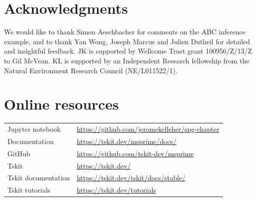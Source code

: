 \documentclass[graybox]{svmult}
\begin{document}
\section*{Acknowledgments}

We would like to thank Simon Aeschbacher for comments on the ABC inference example,
and to thank Yan Wong, Joseph Marcus and Julien Dutheil for
detailed and insightful feedback.
JK is supported by Wellcome Trust grant 100956/Z/13/Z to Gil McVean.
KL is supported by an Independent Research fellowship from the Natural Environment Research Council (NE/L011522/1).

\section*{Online resources}

\begin{tabular}{ll}
Jupyter notebook & \url{https://github.com/jeromekelleher/spg-chapter} \\
Documentation & \url{https://tskit.dev/msprime/docs/} \\
GitHub & \url{https://github.com/tskit-dev/msprime} \\
Tskit & \url{https://tskit.dev/} \\
Tskit documentation & \url{https://tskit.dev/tskit/docs/stable/} \\
Tskit tutorials & \url{https://tskit.dev/tutorials} \\
\end{tabular}


\end{document}
